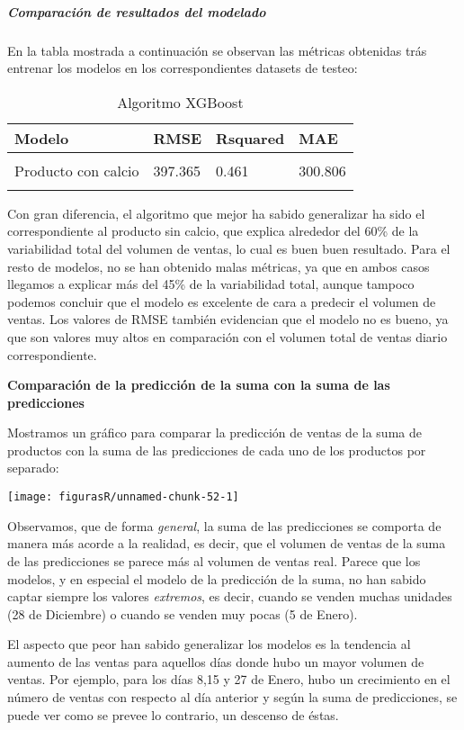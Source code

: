 \documentclass[
]{article}
\begin{document}
\hypertarget{comparaciuxf3n-de-resultados-del-modelado}{%
\subparagraph{Comparación de resultados del
modelado}\label{comparaciuxf3n-de-resultados-del-modelado}}

En la tabla mostrada a continuación se observan las métricas obtenidas
trás entrenar los modelos en los correspondientes datasets de testeo:

\begin{table}[!h]

\caption{\label{tab:unnamed-chunk-50}Algoritmo XGBoost}
\centering
\begin{tabular}[t]{llll}
\toprule
Modelo & RMSE & Rsquared & MAE\\
\midrule
\cellcolor{gray!6}{Suma de productos} & \cellcolor{gray!6}{624.015} & \cellcolor{gray!6}{0.586} & \cellcolor{gray!6}{365.917}\\
Producto con calcio & 397.365 & 0.461 & 300.806\\
\cellcolor{gray!6}{Producto sin calcio} & \cellcolor{gray!6}{286.261} & \cellcolor{gray!6}{0.601} & \cellcolor{gray!6}{165.333}\\
\bottomrule
\end{tabular}
\end{table}

Con gran diferencia, el algoritmo que mejor ha sabido generalizar ha
sido el correspondiente al producto sin calcio, que explica alrededor
del 60\% de la variabilidad total del volumen de ventas, lo cual es buen
buen resultado. Para el resto de modelos, no se han obtenido malas
métricas, ya que en ambos casos llegamos a explicar más del 45\% de la
variabilidad total, aunque tampoco podemos concluir que el modelo es
excelente de cara a predecir el volumen de ventas. Los valores de RMSE
también evidencian que el modelo no es bueno, ya que son valores muy
altos en comparación con el volumen total de ventas diario
correspondiente.

\textbf{Comparación de la predicción de la suma con la suma de las
predicciones}

Mostramos un gráfico para comparar la predicción de ventas de la suma de
productos con la suma de las predicciones de cada uno de los productos
por separado:

\begin{center}\texttt{[image: figurasR/unnamed-chunk-52-1]} \end{center}

Observamos, que de forma \emph{general}, la suma de las predicciones se
comporta de manera más acorde a la realidad, es decir, que el volumen de
ventas de la suma de las predicciones se parece más al volumen de ventas
real. Parece que los modelos, y en especial el modelo de la predicción
de la suma, no han sabido captar siempre los valores \emph{extremos}, es
decir, cuando se venden muchas unidades (28 de Diciembre) o cuando se
venden muy pocas (5 de Enero).

El aspecto que peor han sabido generalizar los modelos es la tendencia
al aumento de las ventas para aquellos días donde hubo un mayor volumen
de ventas. Por ejemplo, para los días 8,15 y 27 de Enero, hubo un
crecimiento en el número de ventas con respecto al día anterior y según
la suma de predicciones, se puede ver como se prevee lo contrario, un
descenso de éstas.
\end{document}
